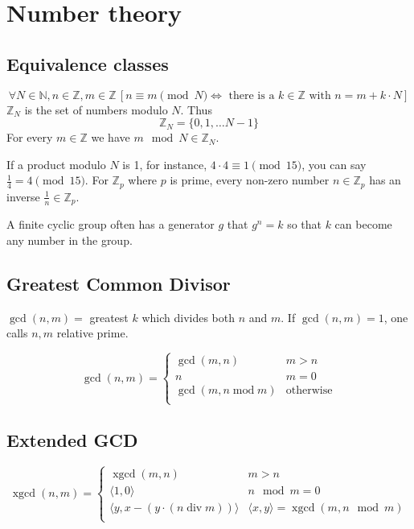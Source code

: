 \documentclass{article}
\newcommand{\wmod}[1]{\pmod{#1}}
\newcommand{\ZZ}{\mathbb{Z}}
\newcommand{\Z}{\ZZ}
\newcommand{\NN}{\mathbb{N}}
\newcommand{\N}{\NN}
\newcommand{\egcd}{\operatorname{xgcd}}
\begin{document}
\section{Number theory}

\subsection{Equivalence classes}

\[ \forall N \in \N, n \in \Z, m \in \Z 
  \,[n \equiv m \wmod{N} \Leftrightarrow 
      \text{ there is a } k \in \Z \text { with } n = m + k \cdot N]
\]
$\Z_N$ is the set of numbers modulo $N$. Thus 
\[ \Z_N = \{ 0, 1, \dots N-1\} \]
For every $m \in \Z$ we have $m \mod N \in \Z_N$.

If a product modulo $N$ is 1, for instance, $4 \cdot 4 \equiv 1 \wmod{15}$, you
can say $\frac{1}{4}=4 \wmod{15}$. For $\Z_p$ where $p$ is prime, every
non-zero number $n \in \Z_p$ has an inverse $\frac{1}{n} \in \Z_p$.

A finite cyclic group often has a generator $g$ that $g^n = k$ so that $k$ can become
any number in the group.

\subsection{Greatest Common Divisor}

$\gcd(n,m) = $ greatest $k$ which divides both $n$ and $m$. If $\gcd(n,m) = 1$, one
calls $n,m$ relative prime.

\[ 
  \gcd (n,m) = \begin{cases}
    \gcd(m,n) & m > n \\
    n & m=0 \\
    \gcd(m, n \operatorname{mod} m) & \text{otherwise}\\
  \end{cases}
\]

\subsection{Extended GCD}

\[
  \egcd(n,m) = \begin{cases}
    \egcd(m,n) & m > n \\
    \langle 1,0 \rangle & n \mod m = 0 \\
    \langle y, x - (y \cdot (n \operatorname{div} m))\rangle & \langle x, y \rangle = \egcd(m, n \mod m) \\
  \end{cases}
\]
\end{document}
